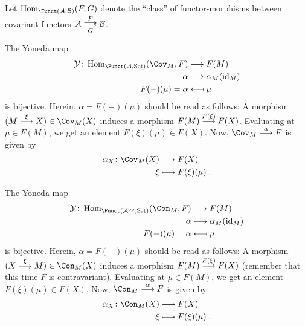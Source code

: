 \documentclass[a4paper,parskip=half,numbers=enddot, DIV=12]{scrreprt}
\begin{document}
  \begin{lem}
  	Let $\Hom_{\Funct(\Aa,\Bb)}(F,G)$ denote the ``class'' of functor-morphisms between covariant functors $\Aa\doublemorphism[F][G] \Bb$.
  	\begin{alphanumerate}
  		\item The Yoneda map
  		\begin{align*}
  		\Yy\colon\Hom_{\Funct(\Aa,\cat{Set})}(\Cov_M, F) &\longto F(M)\\
  		\alpha &\longmapsto \alpha_M(\id_M)\\
  		F(-)(\mu) = \alpha &\longmapsfrom \mu
  		\end{align*}
  		is bijective. Herein, $\alpha=F(-)(\mu)$ should be read as follows: A morphism ${(M\morphism[\xi]X)}\in \Cov_M(X)$ induces a morphism $F(M)\morphism[F(\xi)]F(X)$. Evaluating at $\mu\in F(M)$, we get an element $F(\xi)(\mu)\in F(X)$. Now, $\Cov_M\morphism[\alpha]F$ is given by 
  		\begin{align*}
  		\alpha_X\colon\Cov_M(X)&\morphism F(X)\\
  		\xi&\longmapsto F(\xi)(\mu)\;.
  		\end{align*}
  		\item The Yoneda map
  		\begin{align*}
  		\Yy\colon\Hom_{\Funct(\Aa^\op,\cat{Set})}(\Con_M, F) &\longto F(M)\\
  		\alpha &\longmapsto \alpha_M(\id_M)\\
  		F(-)(\mu) = \alpha &\longmapsfrom \mu
  		\end{align*}
  		is bijective. Herein, $\alpha=F(-)(\mu)$ should be read as follows: A morphism ${(X\morphism[\xi]M)}\in \Con_M(X)$ induces a morphism $F(M)\morphism[F(\xi)]F(X)$ (remember that this time $F$ is contravariant). Evaluating at $\mu\in F(M)$, we get an element $F(\xi)(\mu)\in F(X)$. Now, $\Con_M\morphism[\alpha]F$ is given by 
  		\begin{align*}
  		\alpha_X\colon\Con_M(X)&\morphism F(X)\\
  		\xi&\longmapsto F(\xi)(\mu)\;.
  		\end{align*}
  	\end{alphanumerate}
  \end{lem}
\end{document}
